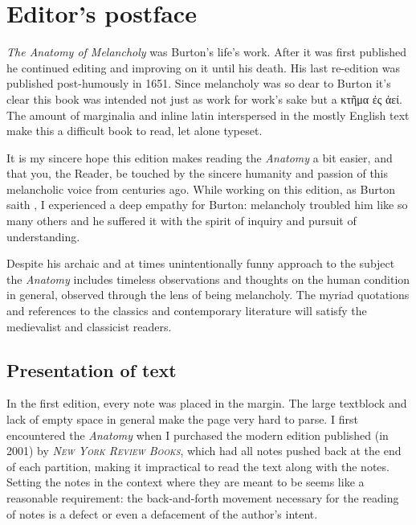 \newlength{\minipagewidth}%
\setlength{\minipagewidth}{0.3\textwidth}%
\newlength{\pageratio}%
\setlength{\pageratio}{\dimexpr((\paperheight)/(\paperwidth))\relax}%
\newlength{\minipageheight}%
\setlength{\minipageheight}{\dimexpr(\pageratio*\minipagewidth)\relax}%
\chapter{Editor's postface}\label{ch:postface}

\emph{The Anatomy of Melancholy} was Burton's life's work. After it was first published he continued editing and improving on it until his death. His last re-edition was published post-humously in 1651. Since melancholy was so dear to Burton it's clear this book was intended not just as work for work's sake but a \textgreek{κτῆμα ἐς ἀεί}. The amount of marginalia and inline latin interspersed in the mostly English text make this a difficult book to read, let alone typeset.

It is my sincere hope this edition makes reading the \emph{Anatomy} a bit easier, and that you, the Reader, be touched by the sincere humanity and passion of this melancholic voice from centuries ago. While working on this edition, as Burton saith , I experienced a deep empathy for Burton: melancholy troubled him like so many others and he suffered it with the spirit of inquiry and pursuit of understanding.

Despite his archaic and at times unintentionally funny approach to the subject the \emph{Anatomy} includes timeless observations and thoughts on the human condition in general, observed through the lens of being melancholy. The myriad quotations and references to the classics and contemporary literature will satisfy the medievalist and classicist readers.

\section*{Presentation of text}

In the first edition, every note was placed in the margin. The large textblock and lack of empty space in general make the page very hard to parse. I first encountered the \emph{Anatomy} when I purchased the modern edition published (in 2001) by \emph{\textsc{New York Review Books}}, which had all notes pushed back at the end of each partition, making it impractical to read the text along with the notes. Setting the notes in the context where they are meant to be seems like a reasonable requirement: the back-and-forth movement necessary for the reading of notes is a defect or even a defacement of the author's intent.

